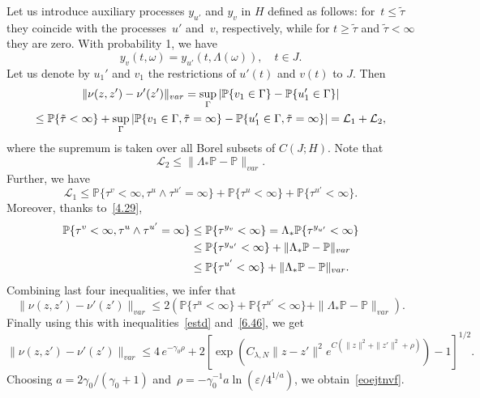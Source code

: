 \documentclass[AHL,Unicode,longabstracts]{cedram}
\newcommand{\e}{\varepsilon}
\newcommand{\pP}{{\mathbb P}}
\newcommand{\la}{\lambda}
\newcommand{\ty}{\infty}
\newcommand{\om}{\omega}
\newcommand{\elll}{{\mathcal L}}
\begin{document}
Let us introduce auxiliary processes $ y_{u'}$ and $y_v$ in $H$ defined as follows: for~$t\leq \tilde\tau$ they coincide with the processes~$ u'$ and~$v$, respectively, while for $t\geq\tilde\tau$ and $\tilde\tau<\ty$ they are zero. With probability 1, we have
\begin{equation}\label{4.29}
y_v(t,\om)=y_{u'}(t,\Lambda(\om)), \quad t\in J.
\end{equation}
Let us denote by $u_1'$ and $v_1$ the restrictions of $u'(t)$ and $v(t)$ to $J$. Then
\begin{multline*}
\| \nu(z,z')-\nu'(z')\|_{var}=\sup_{\Gamma}|\pP\{v_1\in\Gamma\}-\pP\{u'_1\in\Gamma\}\notag|\\
\leq \pP\{\tilde\tau<\ty\}+ \sup_{\Gamma}|\pP\{v_1\in\Gamma, \tilde\tau=\ty\} -\pP\{u'_1\in\Gamma, \tilde\tau=\ty\}|=\elll_1+\elll_2,
\end{multline*}
where the supremum is taken over all Borel subsets of $C(J;H)$. Note that
\[
\elll_2\leq\|\Lambda_*\pP-\pP\|_{var}.
\]
Further, we have
\[
\elll_1\leq \pP\{\tau^v<\ty, \tau^u\wedge\tau^{u'}=\ty\}+\pP\{\tau^u<\ty\}+\pP\{\tau^{u'}<\ty\}.
\]
Moreover, thanks to~\eqref{4.29},
\begin{align*}
\pP\{\tau^v<\ty, \tau^u\wedge\tau^{u'}=\ty\}&\leq\pP\{\tau^{y_v}<\ty\}=\Lambda_*\pP\{\tau^{y_{u'}}<\ty\}\notag\\
&\leq \pP\{\tau^{y_{u'}}<\ty\}+\|\Lambda_*\pP-\pP\|_{var}\notag\\
&\leq \pP\{\tau^{{u'}}<\ty\}+\|\Lambda_*\pP-\pP\|_{var}.
\end{align*}
Combining last four inequalities, we infer that
\[
\| \nu(z,z')-\nu'(z')\|_{var}\leq 2\left(\pP\{\tau^{u}<\ty\}+\pP\{\tau^{u'}<\ty\}+\|\Lambda_*\pP-\pP\|_{var}\right).
\]
Finally using this with inequalities~\eqref{estd} and~\eqref{6.46}, we get
\[
\| \nu(z,z')-\nu'(z')\|_{var}\leq 4\,e^{-\gamma_0\rho}+2\left[\exp\left(C_{\la, N}\|z-z'\|^2 e^{C(\|z\|^2+\|z'\|^2+\rho)} \right)-1\right]^{1/2}.
\]
Choosing $a=2\gamma_0/(\gamma_0+1)$ and~$\rho=-\gamma_0^{-1}a\ln(\e/4^{1/a})$, we obtain~\eqref{eoejtnvf}.
\end{document}
